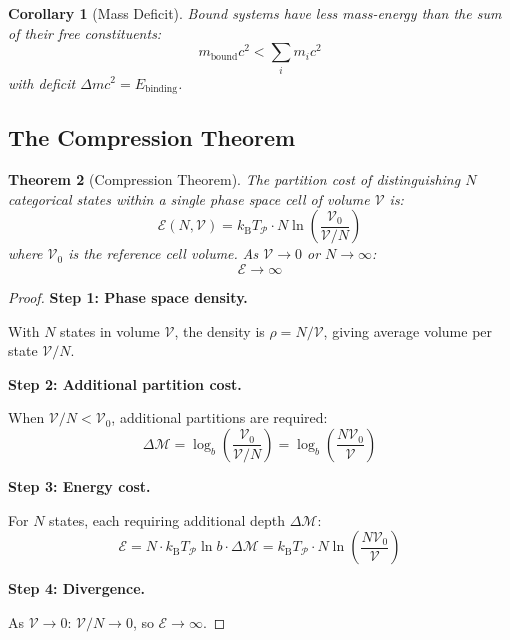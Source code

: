 \documentclass[twocolumn,10pt,a4paper]{article}
\newtheorem{theorem}{Theorem}[section]
\newtheorem{corollary}[theorem]{Corollary}
\theoremstyle{definition}
\theoremstyle{remark}
\newcommand{\kB}{k_{\mathrm{B}}}
\newcommand{\Partition}{\mathcal{P}}
\newcommand{\Depth}{\mathcal{M}}
\newcommand{\Cost}{\mathcal{E}}
\begin{document}
\begin{corollary}[Mass Deficit]
\label{cor:mass_deficit}
Bound systems have less mass-energy than the sum of their free constituents:
\begin{equation}
    m_{\text{bound}} c^2 < \sum_{i} m_i c^2
\end{equation}
with deficit $\Delta m c^2 = E_{\text{binding}}$.
\end{corollary}

\subsection{The Compression Theorem}

\begin{theorem}[Compression Theorem]
\label{thm:compression}
The partition cost of distinguishing $N$ categorical states within a single phase space cell of volume $\mathcal{V}$ is:
\begin{equation}
    \Cost(N, \mathcal{V}) = \kB T_{\Partition} \cdot N \ln\left(\frac{\mathcal{V}_0}{\mathcal{V}/N}\right)
\end{equation}
where $\mathcal{V}_0$ is the reference cell volume. As $\mathcal{V} \to 0$ or $N \to \infty$:
\begin{equation}
    \Cost \to \infty
\end{equation}
\end{theorem}

\begin{proof}
\textbf{Step 1: Phase space density.}

With $N$ states in volume $\mathcal{V}$, the density is $\rho = N/\mathcal{V}$, giving average volume per state $\mathcal{V}/N$.

\textbf{Step 2: Additional partition cost.}

When $\mathcal{V}/N < \mathcal{V}_0$, additional partitions are required:
\begin{equation}
    \Delta\Depth = \log_b\left(\frac{\mathcal{V}_0}{\mathcal{V}/N}\right) = \log_b\left(\frac{N\mathcal{V}_0}{\mathcal{V}}\right)
\end{equation}

\textbf{Step 3: Energy cost.}

For $N$ states, each requiring additional depth $\Delta\Depth$:
\begin{equation}
    \Cost = N \cdot \kB T_{\Partition} \ln b \cdot \Delta\Depth = \kB T_{\Partition} \cdot N \ln\left(\frac{N\mathcal{V}_0}{\mathcal{V}}\right)
\end{equation}

\textbf{Step 4: Divergence.}

As $\mathcal{V} \to 0$: $\mathcal{V}/N \to 0$, so $\Cost \to \infty$.
\end{proof}
\end{document}
